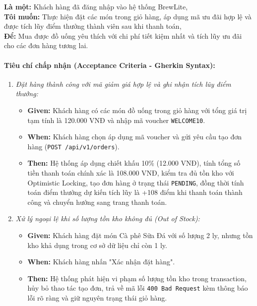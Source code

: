 \begin{tcolorbox}[colback=blue!3,colframe=blue!40,title=\textbf{User Story US-05: Đặt hàng trực tuyến với mã ưu đãi}]
\textbf{Là một:} Khách hàng đã đăng nhập vào hệ thống BrewLite,\\
\textbf{Tôi muốn:} Thực hiện đặt các món trong giỏ hàng, áp dụng mã ưu đãi hợp lệ và được tích lũy điểm thưởng thành viên sau khi thanh toán,\\
\textbf{Để:} Mua được đồ uống yêu thích với chi phí tiết kiệm nhất và tích lũy ưu đãi cho các đơn hàng tương lai.
\end{tcolorbox}

\paragraph{Tiêu chí chấp nhận (Acceptance Criteria - Gherkin Syntax):}
\begin{enumerate}[label=\textbf{Kịch bản \arabic*:}]
    \item \textit{Đặt hàng thành công với mã giảm giá hợp lệ và ghi nhận tích lũy điểm thưởng:}
    \begin{itemize}
        \item \textbf{Given:} Khách hàng có các món đồ uống trong giỏ hàng với tổng giá trị tạm tính là 120.000 VNĐ và nhập mã voucher \texttt{WELCOME10}.
        \item \textbf{When:} Khách hàng chọn áp dụng mã voucher và gửi yêu cầu tạo đơn hàng (\texttt{POST /api/v1/orders}).
        \item \textbf{Then:} Hệ thống áp dụng chiết khấu 10\% (12.000 VNĐ), tính tổng số tiền thanh toán chính xác là 108.000 VNĐ, kiểm tra đủ tồn kho với Optimistic Locking, tạo đơn hàng ở trạng thái \texttt{PENDING}, đồng thời tính toán điểm thưởng dự kiến tích lũy là +108 điểm khi thanh toán thành công và chuyển hướng sang trang thanh toán.
    \end{itemize}
    \item \textit{Xử lý ngoại lệ khi số lượng tồn kho không đủ (Out of Stock):}
    \begin{itemize}
        \item \textbf{Given:} Khách hàng đặt món Cà phê Sữa Đá với số lượng 2 ly, nhưng tồn kho khả dụng trong cơ sở dữ liệu chỉ còn 1 ly.
        \item \textbf{When:} Khách hàng nhấn "Xác nhận đặt hàng".
        \item \textbf{Then:} Hệ thống phát hiện vi phạm số lượng tồn kho trong transaction, hủy bỏ thao tác tạo đơn, trả về mã lỗi \texttt{400 Bad Request} kèm thông báo lỗi rõ ràng và giữ nguyên trạng thái giỏ hàng.
    \end{itemize}
\end{enumerate}
